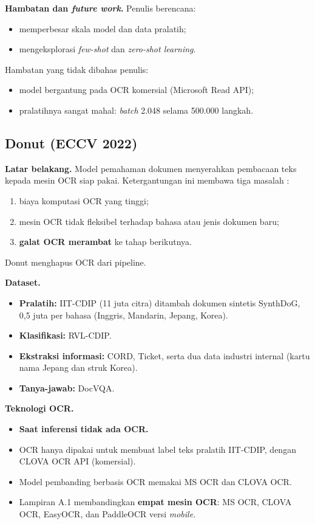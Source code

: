 \textbf{Hambatan dan \textit{future work}.} Penulis berencana:
\begin{itemize}
  \item memperbesar skala model dan data pralatih;
  \item mengeksplorasi \textit{few-shot} dan \textit{zero-shot learning}.
\end{itemize}
Hambatan yang tidak dibahas penulis:
\begin{itemize}
  \item model bergantung pada OCR komersial (Microsoft Read API);
  \item pralatihnya sangat mahal: \textit{batch} 2.048 selama 500.000 langkah.
\end{itemize}

\subsection{Donut (ECCV 2022)}\label{sec:donut}

\textbf{Latar belakang.} Model pemahaman dokumen menyerahkan pembacaan teks kepada mesin
OCR siap pakai. Ketergantungan ini membawa tiga masalah \parencite{kim2022donut}:
\begin{enumerate}
  \item biaya komputasi OCR yang tinggi;
  \item mesin OCR tidak fleksibel terhadap bahasa atau jenis dokumen baru;
  \item \textbf{galat OCR merambat} ke tahap berikutnya.
\end{enumerate}
Donut menghapus OCR dari pipeline.

\textbf{Dataset.}
\begin{itemize}
  \item \textbf{Pralatih:} IIT-CDIP (11 juta citra) ditambah dokumen sintetis SynthDoG,
  0,5 juta per bahasa (Inggris, Mandarin, Jepang, Korea).
  \item \textbf{Klasifikasi:} RVL-CDIP.
  \item \textbf{Ekstraksi informasi:} CORD, Ticket, serta dua data industri internal
  (kartu nama Jepang dan struk Korea).
  \item \textbf{Tanya-jawab:} DocVQA.
\end{itemize}

\textbf{Teknologi OCR.}
\begin{itemize}
  \item \textbf{Saat inferensi tidak ada OCR.}
  \item OCR hanya dipakai untuk membuat label teks pralatih IIT-CDIP, dengan CLOVA OCR API
  (komersial).
  \item Model pembanding berbasis OCR memakai MS OCR dan CLOVA OCR.
  \item Lampiran A.1 membandingkan \textbf{empat mesin OCR}: MS OCR, CLOVA OCR, EasyOCR, dan
  PaddleOCR versi \textit{mobile}.
\end{itemize}

